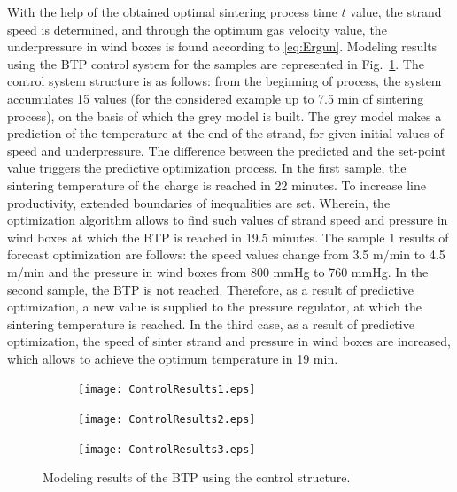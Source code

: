 \documentclass[AMS,STIX2COL]{WileyNJD-v2}
\begin{document}
With the help of the obtained optimal sintering process time $t$  value, the strand speed is determined, and through the optimum gas velocity value, the underpressure in wind boxes is found according to \eqref{eq:Ergun}. Modeling results using the BTP control system for the samples are represented in Fig.~\ref{fig:ControlResults}. The control system structure is as follows: from the beginning of process, the system accumulates 15 values (for the considered example up to 7.5 min of sintering process), on the basis of which the grey model is built. The grey model makes a prediction of the temperature at the end of the strand, for given initial values of speed and underpressure. The difference between the predicted and the set-point value triggers the predictive optimization process. In the first sample, the sintering temperature of the charge is reached in 22 minutes. To increase line productivity, extended boundaries of inequalities are set. Wherein, the optimization algorithm allows to find such values of strand speed and pressure in wind boxes at which the BTP is reached in 19.5 minutes. The sample 1 results of forecast optimization are follows: the speed values change from 3.5 m/min to 4.5 m/min and the pressure in wind boxes from 800 mmHg to 760 mmHg. In the second sample, the BTP is not reached. Therefore, as a result of predictive optimization, a new value is supplied to the pressure regulator, at which the sintering temperature is reached. In the third case, as a result of predictive optimization, the speed of sinter strand and pressure in wind boxes are increased, which allows to achieve the optimum temperature in 19 min.

\begin{figure}
	\centering
	\begin{subfigure}{.5\textwidth}
		\centering
		\texttt{[image: ControlResults1.eps]}
	\end{subfigure}%
	\begin{subfigure}{.5\textwidth}
		\centering
		\texttt{[image: ControlResults2.eps]}
	\end{subfigure}
	\begin{subfigure}{.5\textwidth}
	\centering
	\texttt{[image: ControlResults3.eps]}
	\end{subfigure}
	\caption{Modeling results of the BTP using the control structure.}
	\label{fig:ControlResults}
\end{figure}
\end{document}
